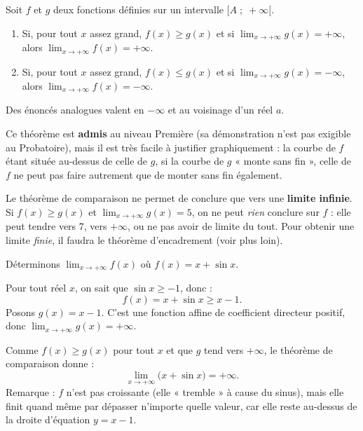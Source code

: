 \documentclass[11pt]{article}
\begin{document}
\begin{propriete}
Soit $f$ et $g$ deux fonctions définies sur un intervalle $[A\;;\;+\infty[$.
\begin{enumerate}
\item Si, pour tout $x$ assez grand, $f(x) \geq g(x)$ et si $\displaystyle\lim_{x\to+\infty} g(x) = +\infty$, alors $\displaystyle\lim_{x\to+\infty} f(x) = +\infty$.
\item Si, pour tout $x$ assez grand, $f(x) \leq g(x)$ et si $\displaystyle\lim_{x\to+\infty} g(x) = -\infty$, alors $\displaystyle\lim_{x\to+\infty} f(x) = -\infty$.
\end{enumerate}
Des énoncés analogues valent en $-\infty$ et au voisinage d'un réel $a$.
\end{propriete}

Ce théorème est \textbf{admis} au niveau Première (sa démonstration n'est pas exigible au Probatoire), mais il est très facile à justifier graphiquement : la courbe de $f$ étant située au-dessus de celle de $g$, si la courbe de $g$ « monte sans fin », celle de $f$ ne peut pas faire autrement que de monter sans fin également.

\begin{attention}
Le théorème de comparaison ne permet de conclure que vers une \textbf{limite infinie}. Si $f(x) \geq g(x)$ et $\displaystyle\lim_{x\to+\infty} g(x) = 5$, on ne peut \emph{rien} conclure sur $f$ : elle peut tendre vers $7$, vers $+\infty$, ou ne pas avoir de limite du tout. Pour obtenir une limite \emph{finie}, il faudra le théorème d'encadrement (voir plus loin).
\end{attention}

\begin{exemplebox}
Déterminons $\displaystyle\lim_{x\to+\infty} f(x)$ où $f(x) = x + \sin x$.

Pour tout réel $x$, on sait que $\sin x \geq -1$, donc :
\[ f(x) = x + \sin x \geq x - 1. \]
Posons $g(x) = x - 1$. C'est une fonction affine de coefficient directeur positif, donc $\displaystyle\lim_{x\to+\infty} g(x) = +\infty$.

Comme $f(x) \geq g(x)$ pour tout $x$ et que $g$ tend vers $+\infty$, le théorème de comparaison donne :
\[ \lim_{x\to+\infty} \bigl(x + \sin x\bigr) = +\infty. \]
Remarque : $f$ n'est pas croissante (elle « tremble » à cause du sinus), mais elle finit quand même par dépasser n'importe quelle valeur, car elle reste au-dessus de la droite d'équation $y = x - 1$.
\end{exemplebox}
\end{document}
